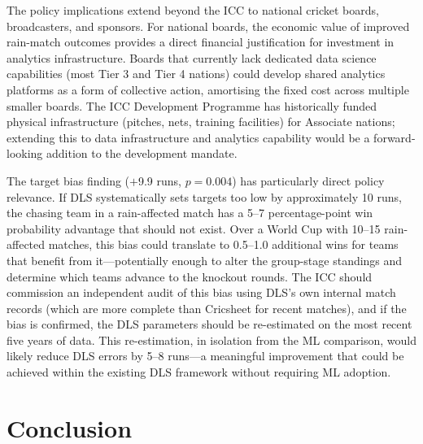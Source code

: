 \documentclass[10pt,a4paper,twocolumn]{article}
\begin{document}
The policy implications extend beyond the ICC to national cricket boards, broadcasters, and sponsors. For national boards, the economic value of improved rain-match outcomes provides a direct financial justification for investment in analytics infrastructure. Boards that currently lack dedicated data science capabilities (most Tier 3 and Tier 4 nations) could develop shared analytics platforms as a form of collective action, amortising the fixed cost across multiple smaller boards. The ICC Development Programme has historically funded physical infrastructure (pitches, nets, training facilities) for Associate nations; extending this to data infrastructure and analytics capability would be a forward-looking addition to the development mandate.

The target bias finding ($+$9.9 runs, $p = 0.004$) has particularly direct policy relevance. If DLS systematically sets targets too low by approximately 10 runs, the chasing team in a rain-affected match has a 5--7 percentage-point win probability advantage that should not exist. Over a World Cup with 10--15 rain-affected matches, this bias could translate to 0.5--1.0 additional wins for teams that benefit from it---potentially enough to alter the group-stage standings and determine which teams advance to the knockout rounds. The ICC should commission an independent audit of this bias using DLS's own internal match records (which are more complete than Cricsheet for recent matches), and if the bias is confirmed, the DLS parameters should be re-estimated on the most recent five years of data. This re-estimation, in isolation from the ML comparison, would likely reduce DLS errors by 5--8 runs---a meaningful improvement that could be achieved within the existing DLS framework without requiring ML adoption.

\section{Conclusion}
\label{sec:conclusion}
\end{document}
